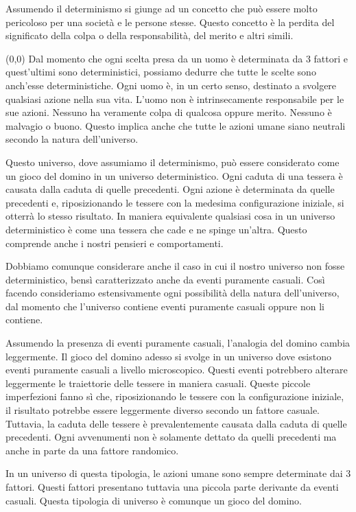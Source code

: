 \documentclass[a4paper, 12pt]{article}
\newcommand{\ownright}[0]{%
    \makebox(0,0){
        \stackon[8pt]{\phantom{A}}{
            \begin{tikzpicture}
                \fill (0,0) -- (0,0.3) -- ++(0.05,0) -- (0.05,0);
                \fill (0,0.3) -- ++(0.3,0) -- (0.3,0.25) -- (0.05,0.25);
            \end{tikzpicture}
        }
    }%
}
\begin{document}
Assumendo il determinismo si giunge ad un concetto che può essere molto pericoloso per una società
e le persone stesse. Questo concetto è la perdita del significato della colpa o della responsabilità, del merito e altri simili.

\ownright{}%
Dal momento che ogni scelta presa
da un uomo è determinata da 3 fattori e
quest'ultimi sono deterministici, possiamo
dedurre che tutte le scelte sono
anch'esse deterministiche.
Ogni uomo è, in un certo senso, destinato a
svolgere qualsiasi azione nella sua vita.
L'uomo non è intrinsecamente responsabile
per le sue azioni. Nessuno ha veramente colpa di qualcosa oppure
merito. Nessuno è malvagio o buono. Questo
implica anche che tutte le azioni umane siano
neutrali secondo la natura dell'universo.

Questo universo, dove assumiamo il determinismo, può essere considerato come un gioco del domino in un universo deterministico.
Ogni caduta di una tessera è causata dalla caduta di quelle precedenti. Ogni azione è determinata da quelle precedenti
e, riposizionando le tessere con la medesima configurazione
iniziale, si otterrà lo stesso risultato.
In maniera equivalente qualsiasi cosa in un 
universo deterministico è come una tessera che cade
e ne spinge un'altra. Questo comprende anche i nostri
pensieri e comportamenti.

Dobbiamo comunque considerare anche il caso in cui
il nostro universo non fosse deterministico, bensì
caratterizzato anche da eventi puramente casuali.
Così facendo consideriamo estensivamente ogni possibilità
della natura dell'universo, dal momento che
l'universo contiene eventi puramente casuali oppure
non li contiene.

Assumendo la presenza di eventi puramente casuali,
l'analogia del domino cambia leggermente.
Il gioco del domino adesso si svolge in un universo
dove esistono eventi puramente casuali a livello microscopico.
Questi eventi potrebbero alterare leggermente
le traiettorie delle tessere in maniera casuali.
Queste piccole imperfezioni fanno sì che,
riposizionando le tessere con la configurazione iniziale,
il risultato potrebbe essere leggermente diverso
secondo un fattore casuale. Tuttavia,
la caduta delle tessere è prevalentemente
causata dalla caduta di quelle precedenti.
Ogni avvenumenti non è solamente dettato da quelli precedenti
ma anche in parte da una fattore randomico.

In un universo di questa tipologia, le azioni umane
sono sempre determinate dai 3 fattori.
Questi fattori presentano tuttavia una piccola
parte derivante da eventi casuali.
Questa tipologia di universo è comunque un gioco
del domino.
\end{document}
